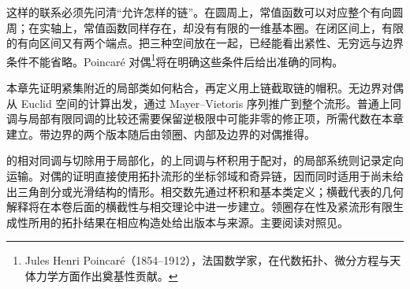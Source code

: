 \ProseParagraphBreak

这样的联系必须先问清“允许怎样的链”。在圆周上，常值函数可以对应整个有向圆周；在实轴上，常值函数同样存在，却没有有限的一维基本圈。在闭区间上，有限的有向区间又有两个端点。把三种空间放在一起，已经能看出紧性、无穷远与边界条件不能省略。Poincaré 对偶\footnote{Jules Henri Poincaré（1854--1912），法国数学家，在代数拓扑、微分方程与天体力学方面作出奠基性贡献。}将在明确这些条件后给出准确的同构。

\ProseParagraphBreak

本章先证明紧集附近的局部类如何粘合，再定义用上链截取链的帽积。无边界对偶从 Euclid 空间的计算出发，通过 Mayer--Vietoris 序列推广到整个流形。普通上同调与局部有限同调的比较还需要保留逆极限中可能非零的修正项，所需代数在本章建立。带边界的两个版本随后由领圈、内部及边界的对偶推得。

\ProseParagraphBreak

的相对同调与切除用于局部化，的上同调与杯积用于配对，的局部系统则记录定向运输。对偶的证明直接使用拓扑流形的坐标邻域和奇异链，因而同时适用于尚未给出三角剖分或光滑结构的情形。相交数先通过杯积和基本类定义；横截代表的几何解释将在本卷后面的横截性与相交理论中进一步建立。领圈存在性及紧流形有限生成性所用的拓扑结果在相应构造处给出版本与来源。主要阅读对照见\cite[第3.3节、第3.H节]{Hatcher2002}。







